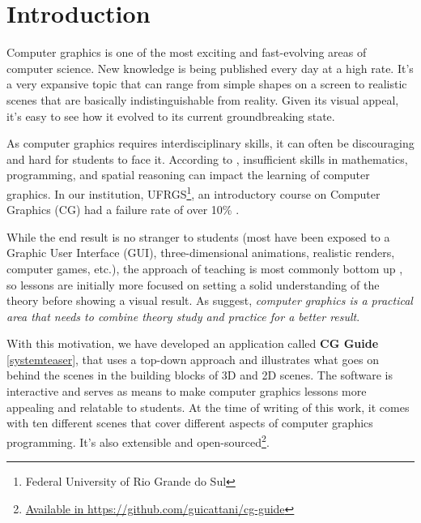 \documentclass[cic,tc,english]{iiufrgs}
\begin{document}

\tableofcontents

\chapter{Introduction}

Computer graphics is one of the most exciting and fast-evolving areas of computer science. New knowledge is being published every day at a high rate. \cite{walter2017whatareweteaching}  It's a very expansive topic that can range from simple shapes on a screen to realistic scenes that are basically indistinguishable from reality. Given its visual appeal, it's easy to see how it evolved to its current groundbreaking state.

As computer graphics requires interdisciplinary skills, it can often be discouraging and hard for students to face it. According to \citet{Suselo2017JourneyTeachingCG}, insufficient skills in mathematics, programming, and spatial reasoning can impact the learning of computer graphics. In our institution, UFRGS\footnote{Federal University of Rio Grande do Sul}, an introductory course on Computer Graphics (CG) had a failure rate of over 10\% \cite{ApratoNeto2021INFCourseFailure}.

While the end result is no stranger to students (most have been exposed to a Graphic User Interface (GUI), three-dimensional animations, realistic renders, computer games, etc.), the approach of teaching is most commonly bottom up \cite{SungShirley2003TopDownApproach}, so lessons are initially more focused on setting a solid understanding of the theory before showing a visual result. As \citet{He2012ReformComputerGraphics} suggest, \textit{computer graphics is a practical area that needs to combine theory study and practice for a better result}.

With this motivation, we have developed an application called \textbf{CG Guide} \cref{systemteaser}, that uses a top-down approach and illustrates what goes on behind the scenes in the building blocks of 3D and 2D scenes. The software is interactive and serves as means to make computer graphics lessons more appealing and relatable to students. At the time of writing of this work, it comes with ten different scenes that cover different aspects of computer graphics programming. It's also extensible and open-sourced\footnote{\href{https://github.com/guicattani/cg-guide}{Available in https://github.com/guicattani/cg-guide}}.
\end{document}
